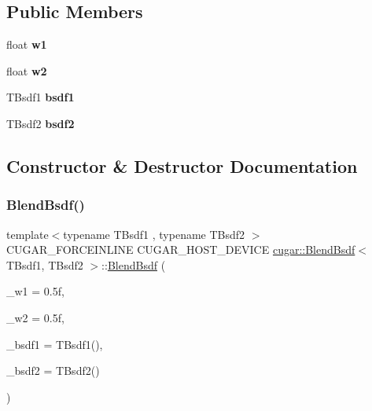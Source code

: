 \subsection*{Public Members}
\begin{DoxyCompactItemize}
\item 
\mbox{\label{structcugar_1_1_blend_bsdf_a73959ff4a7af6a9fd6c2ea866776c80f}} 
float {\bfseries w1}
\item 
\mbox{\label{structcugar_1_1_blend_bsdf_a486fb30eab1f8906604419dc1fd415b7}} 
float {\bfseries w2}
\item 
\mbox{\label{structcugar_1_1_blend_bsdf_a702893909d451b976e7fbf4785793b1a}} 
T\+Bsdf1 {\bfseries bsdf1}
\item 
\mbox{\label{structcugar_1_1_blend_bsdf_a8beb477a0b37ec4f5f5fbe2965dbcb12}} 
T\+Bsdf2 {\bfseries bsdf2}
\end{DoxyCompactItemize}


\subsection{Constructor \& Destructor Documentation}
\mbox{\label{structcugar_1_1_blend_bsdf_af515289322a7ba88671802d09b4b3b9f}} 
\subsubsection{\texorpdfstring{Blend\+Bsdf()}{BlendBsdf()}}
{\footnotesize\ttfamily template$<$typename T\+Bsdf1 , typename T\+Bsdf2 $>$ \\
C\+U\+G\+A\+R\+\_\+\+F\+O\+R\+C\+E\+I\+N\+L\+I\+NE C\+U\+G\+A\+R\+\_\+\+H\+O\+S\+T\+\_\+\+D\+E\+V\+I\+CE \hyperlink{structcugar_1_1_blend_bsdf}{cugar\+::\+Blend\+Bsdf}$<$ T\+Bsdf1, T\+Bsdf2 $>$\+::\hyperlink{structcugar_1_1_blend_bsdf}{Blend\+Bsdf} (\begin{DoxyParamCaption}\item[{const float}]{\+\_\+w1 = {\ttfamily 0.5f},  }\item[{const float}]{\+\_\+w2 = {\ttfamily 0.5f},  }\item[{const T\+Bsdf1}]{\+\_\+bsdf1 = {\ttfamily TBsdf1()},  }\item[{const T\+Bsdf2}]{\+\_\+bsdf2 = {\ttfamily TBsdf2()} }\end{DoxyParamCaption})\hspace{0.3cm}{\ttfamily [inline]}}

